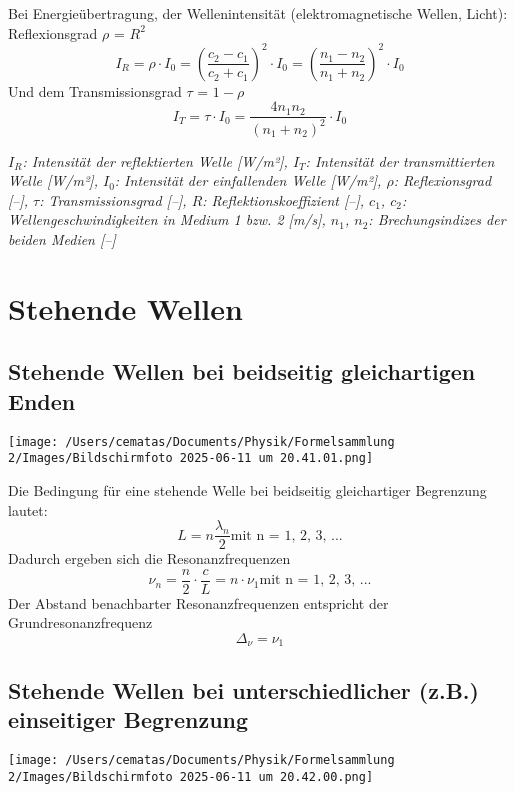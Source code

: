 \documentclass[a4paper,10pt]{article}
\newenvironment{displayformula}
{
	\begin{framed}
		\color{formulaColor}
	}
	{\end{framed}}
\newcommand{\formulalegend}[1]{%
	\par\vspace{0.5ex}%
	{{\color{legendColor}\RaggedRight\small\textit{#1}}}%
	\par\vspace{1.5ex}%
}
\begin{document}
\begin{displayformula}
	Bei Energieübertragung, der Wellenintensität (elektromagnetische Wellen, Licht): \\
	Reflexionsgrad $\rho$ = $R^2$
	\[
	I_R = \rho \cdot I_0 = (\frac{c_2 - c_1}{c_2 + c_1})^2 \cdot I_0 = (\frac{n_1 - n_2}{n_1 + n_2})^2 \cdot I_0
	\]
	Und dem Transmissionsgrad $\tau$ =  $1 - \rho$
	\[
	I_T = \tau \cdot I_0 = \frac{4n_1n_2}{(n_1 + n_2)^2} \cdot I_0
	\]
\end{displayformula}
\formulalegend{
	\( I_R \): Intensität der reflektierten Welle [W/m²], 
	\( I_T \): Intensität der transmittierten Welle [W/m²], 
	\( I_0 \): Intensität der einfallenden Welle [W/m²], 
	\( \rho \): Reflexionsgrad [–], 
	\( \tau \): Transmissionsgrad [–], 
	\( R \): Reflektionskoeffizient [–], 
	\( c_1 \), \( c_2 \): Wellengeschwindigkeiten in Medium 1 bzw. 2 [m/s], 
	\( n_1 \), \( n_2 \): Brechungsindizes der beiden Medien [–]
}


\section{Stehende Wellen}

\subsection{Stehende Wellen bei beidseitig gleichartigen Enden}

\texttt{[image: /Users/cematas/Documents/Physik/Formelsammlung 2/Images/Bildschirmfoto 2025-06-11 um 20.41.01.png]}

\begin{displayformula}
	Die Bedingung für eine stehende Welle bei beidseitig gleichartiger Begrenzung lautet:
	\[
	L = n\frac{\lambda_n}{2} \text{mit n = 1, 2, 3, ...}
	\]
	Dadurch ergeben sich die Resonanzfrequenzen
	\[
	\nu_n = \frac{n}{2} \cdot \frac{c}{L} = n \cdot \nu_1 \text{mit n = 1, 2, 3, ...}
	\]
	Der Abstand benachbarter Resonanzfrequenzen entspricht der Grundresonanzfrequenz
	\[
	\Delta_\nu = \nu_1
	\]
\end{displayformula}


\subsection{Stehende Wellen bei unterschiedlicher (z.B.) einseitiger Begrenzung}

\texttt{[image: /Users/cematas/Documents/Physik/Formelsammlung 2/Images/Bildschirmfoto 2025-06-11 um 20.42.00.png]}
\end{document}
